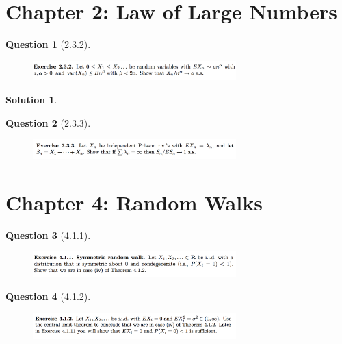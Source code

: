 \documentclass[11pt]{article}
\theoremstyle{plain}
\theoremstyle{quest}
\newtheorem*{question}{Question}
\newtheorem*{solution}{Solution}
\begin{document}
\newpage

\section{Chapter 2: Law of Large Numbers}
\begin{question}[2.3.2]
\hfill
\begin{figure}[h!]
  \centering
    \includegraphics[width=0.7\textwidth]{d-2-3-2.png}
\end{figure}
\end{question}
\begin{solution}

\end{solution}

\newpage

\begin{question}[2.3.3]
\hfill
\begin{figure}[h!]
  \centering
    \includegraphics[width=0.7\textwidth]{d-2-3-3.png}
\end{figure}
\end{question}

\newpage

\section{Chapter 4: Random Walks}

\begin{question}[4.1.1]
\hfill
\begin{figure}[h!]
  \centering
    \includegraphics[width=0.7\textwidth]{d-4-1-1.png}
\end{figure}
\end{question}

\newpage

\begin{question}[4.1.2]
\hfill
\begin{figure}[h!]
  \centering
    \includegraphics[width=0.7\textwidth]{d-4-1-2.png}
\end{figure}
\end{question}
\end{document}
